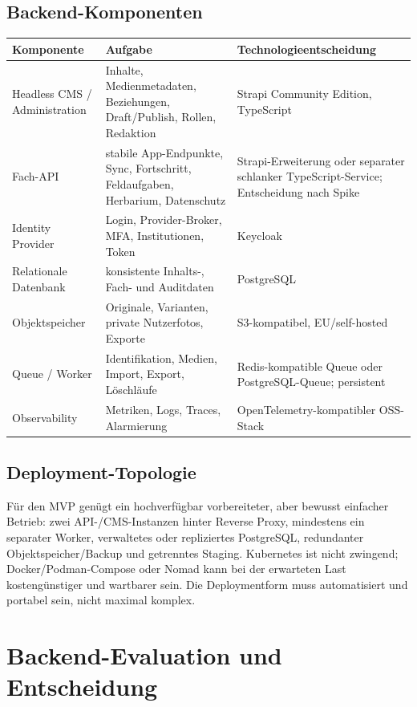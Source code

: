 \documentclass[10pt,a4paper,oneside]{article}
\begin{document}
\subsection{Backend-Komponenten}

\begin{tabularx}{\textwidth}{@{}p{39mm}X p{44mm}@{}}
\toprule
\textbf{Komponente} & \textbf{Aufgabe} & \textbf{Technologieentscheidung} \\
\midrule
Headless CMS / Administration & Inhalte, Medienmetadaten, Beziehungen, Draft/Publish, Rollen, Redaktion & Strapi Community Edition, TypeScript \\
Fach-API & stabile App-Endpunkte, Sync, Fortschritt, Feldaufgaben, Herbarium, Datenschutz & Strapi-Erweiterung oder separater schlanker TypeScript-Service; Entscheidung nach Spike \\
Identity Provider & Login, Provider-Broker, MFA, Institutionen, Token & Keycloak \\
Relationale Datenbank & konsistente Inhalts-, Fach- und Auditdaten & PostgreSQL \\
Objektspeicher & Originale, Varianten, private Nutzerfotos, Exporte & S3-kompatibel, EU/self-hosted \\
Queue / Worker & Identifikation, Medien, Import, Export, Löschläufe & Redis-kompatible Queue oder PostgreSQL-Queue; persistent \\
Observability & Metriken, Logs, Traces, Alarmierung & OpenTelemetry-kompatibler OSS-Stack \\
\bottomrule
\end{tabularx}

\subsection{Deployment-Topologie}

Für den MVP genügt ein hochverfügbar vorbereiteter, aber bewusst einfacher Betrieb: zwei API-/CMS-Instanzen hinter Reverse Proxy, mindestens ein separater Worker, verwaltetes oder repliziertes PostgreSQL, redundanter Objektspeicher/Backup und getrenntes Staging. Kubernetes ist nicht zwingend; Docker/Podman-Compose oder Nomad kann bei der erwarteten Last kostengünstiger und wartbarer sein. Die Deploymentform muss automatisiert und portabel sein, nicht maximal komplex.

\section{Backend-Evaluation und Entscheidung}\label{sec:backend-decision}
\end{document}
